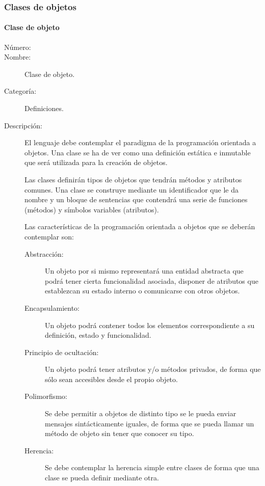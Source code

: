 \subsubsection{Clases de objetos}
\paragraph{Clase de objeto}
\begin{framed}
	\begin{description}
		\item [Número:] \cn
		\item [Nombre:] Clase de objeto.
		\item [Categoría:] Definiciones.
		\item [Descripción:] El lenguaje debe contemplar el paradigma de la programación orientada a objetos. Una clase
      se ha de ver como una definición estática e inmutable que será utilizada para la creación de objetos.
      
      Las clases definirán tipos de objetos que tendrán métodos y atributos comunes. Una clase se construye
		mediante un identificador que le da nombre y un bloque de sentencias que contendrá una serie de funciones (métodos)
		y símbolos variables (atributos).  
      
      Las características de la programación orientada a objetos que se deberán contemplar son:
		\begin{description}
			\item [Abstracción:] Un objeto por si mismo representará una entidad abstracta que podrá tener cierta funcionalidad
			asociada, disponer de atributos que establezcan su estado interno o comunicarse con otros objetos. 
			\item [Encapsulamiento:] Un objeto podrá contener todos los elementos correspondiente a su definición, estado y funcionalidad.
         \item [Principio de ocultación:] Un objeto podrá tener atributos y/o métodos privados, de forma que sólo sean
         accesibles desde el propio objeto. 
			\item [Polimorfismo:] Se debe permitir a objetos de distinto tipo se le pueda enviar mensajes sintácticamente iguales, de forma
			que se pueda  llamar un método de objeto sin tener que conocer su tipo.
			\item [Herencia:] Se debe contemplar la herencia simple entre clases de forma que  una clase se pueda definir mediante otra.
		\end{description}
	\end {description}
\end{framed}

